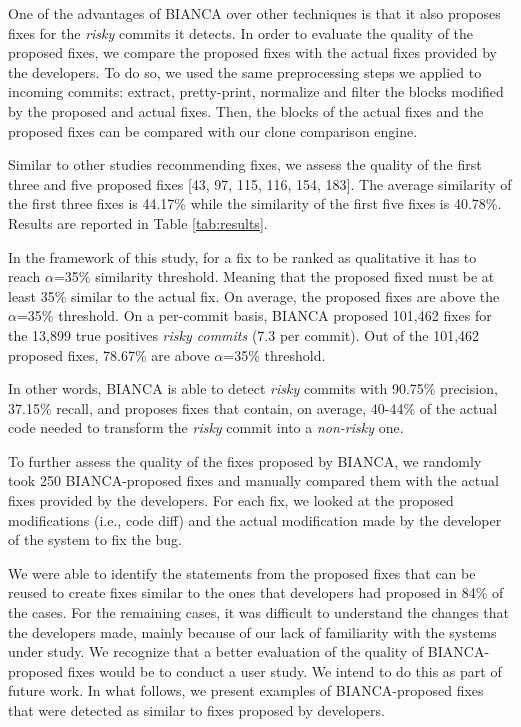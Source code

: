 \documentclass[12pt]{report}
\begin{document}
One of the advantages of BIANCA over other techniques is that it also
proposes fixes for the \emph{risky} commits it detects. In order to
evaluate the quality of the proposed fixes, we compare the proposed
fixes with the actual fixes provided by the developers. To do so, we
used the same preprocessing steps we applied to incoming commits:
extract, pretty-print, normalize and filter the blocks modified by the
proposed and actual fixes. Then, the blocks of the actual fixes and the
proposed fixes can be compared with our clone comparison engine.

Similar to other studies recommending fixes, we assess the quality of
the first three and five proposed fixes {[}43, 97, 115, 116, 154,
183{]}. The average similarity of the first three fixes is 44.17\% while
the similarity of the first five fixes is 40.78\%. Results are reported
in Table \ref{tab:results}.

In the framework of this study, for a fix to be ranked as qualitative it
has to reach \(\alpha\)=35\% similarity threshold. Meaning that the
proposed fixed must be at least 35\% similar to the actual fix. On
average, the proposed fixes are above the \(\alpha\)=35\% threshold. On
a per-commit basis, BIANCA proposed 101,462 fixes for the 13,899 true
positives \emph{risky commits} (7.3 per commit). Out of the 101,462
proposed fixes, 78.67\% are above \(\alpha\)=35\% threshold.

In other words, BIANCA is able to detect \emph{risky} commits with
90.75\% precision, 37.15\% recall, and proposes fixes that contain, on
average, 40-44\% of the actual code needed to transform the \emph{risky}
commit into a \emph{non-risky} one.

To further assess the quality of the fixes proposed by BIANCA, we
randomly took 250 BIANCA-proposed fixes and manually compared them with
the actual fixes provided by the developers. For each fix, we looked at
the proposed modifications (i.e., code diff) and the actual modification
made by the developer of the system to fix the bug.

We were able to identify the statements from the proposed fixes that can
be reused to create fixes similar to the ones that developers had
proposed in 84\% of the cases. For the remaining cases, it was difficult
to understand the changes that the developers made, mainly because of
our lack of familiarity with the systems under study. We recognize that
a better evaluation of the quality of BIANCA-proposed fixes would be to
conduct a user study. We intend to do this as part of future work. In
what follows, we present examples of BIANCA-proposed fixes that were
detected as similar to fixes proposed by developers.
\end{document}
